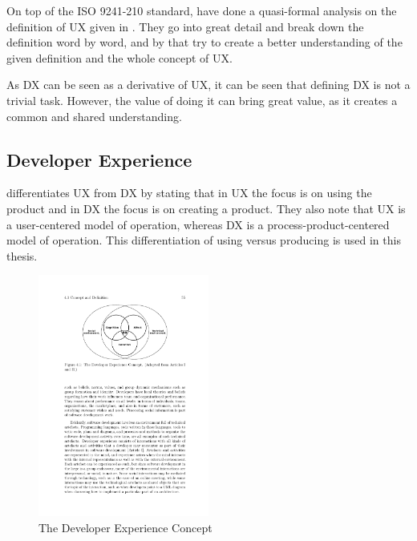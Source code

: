 \documentclass[english, 12pt, a4paper, sci, utf8, a-1b, online]{aaltothesis}
\begin{document}
On top of the ISO 9241-210 standard, \textcite{mirnig2015formal} have done a quasi-formal analysis on the definition of UX given in \textcite{iso-9241-210}. They go into great detail and break down the definition word by word, and by that try to create a better understanding of the given definition and the whole concept of UX.

As DX can be seen as a derivative of UX, it can be seen that defining DX is not a trivial task. However, the value of doing it can bring great value, as it creates a common and shared understanding.

\subsection{Developer Experience}


\textcite[167]{moilanen2018api} differentiates UX from DX by stating that in UX the focus is on using the product and in DX the focus is on creating a product. They also note that UX is a user-centered model of operation, whereas DX is a process-product-centered model of operation. This differentiation of using versus producing is used in this thesis.

\begin{figure}[H]
  \begin{center}
    \includegraphics[width=0.5\textwidth]{dx-social-technical.pdf}
  \end{center}
  \captionsetup{width=0.5\textwidth}
  \caption{The Developer Experience Concept \parencite{fagerholm-doctoral-thesis}}
  \label{figure:social-technical}
\end{figure}
\end{document}
